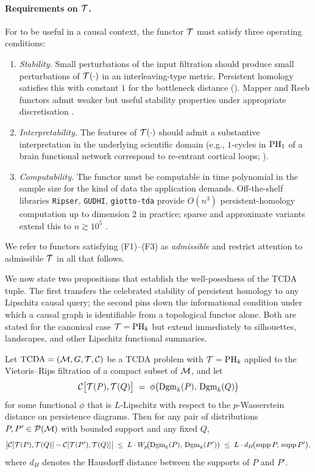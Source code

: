 \paragraph{Requirements on $\mathcal{T}$.}
For  to be useful in a causal context, the functor $\mathcal{T}$
must satisfy three operating conditions:
\begin{enumerate}[leftmargin=2em,label=(F\arabic*)]
\item \emph{Stability.} Small perturbations of the input filtration
should produce small perturbations of $\mathcal{T}(\cdot)$ in an interleaving-type
metric. Persistent homology satisfies this with constant $1$ for the
bottleneck distance (). Mapper and Reeb functors
admit weaker but useful stability properties under appropriate
discretisation \citep{munch2016convergence,carriere2018statistical}.
\item \emph{Interpretability.} The features of $\mathcal{T}(\cdot)$ should admit
a substantive interpretation in the underlying scientific domain (e.g.,
$1$-cycles in $\mathrm{PH}_{1}$ of a brain functional network correspond to
re-entrant cortical loops; \citealp{elyaagoubi2023statistical,
sizemore2018cliques}).
\item \emph{Computability.} The functor must be computable in time
polynomial in the sample size for the kind of data the application
demands. Off-the-shelf libraries \texttt{Ripser}, \texttt{GUDHI},
\texttt{giotto-tda} provide $O(n^3)$ persistent-homology computation up
to dimension $2$ in practice; sparse and approximate variants extend
this to $n \gtrsim 10^5$ \citep{bauer2021ripser,otter2017roadmap,
tauzin2021giotto}.
\end{enumerate}
We refer to functors satisfying (F1)--(F3) as \emph{admissible} and
restrict attention to admissible $\mathcal{T}$ in all that follows.

We now state two propositions that establish the well-posedness of the
TCDA tuple. The first transfers the celebrated stability of persistent
homology to any Lipschitz causal query; the second pins down the
informational condition under which a causal graph is identifiable from
a topological functor alone. Both are stated for the canonical case
$\mathcal{T} = \mathrm{PH}_{k}$ but extend immediately to silhouettes, landscapes, and
other Lipschitz functional summaries.

\begin{proposition}\label{prop:stability-transfer}
Let $\mathrm{TCDA} = (\mathcal{M}, G, \mathcal{T}, \mathcal{C})$ be a TCDA problem with $\mathcal{T} = \mathrm{PH}_{k}$
applied to the Vietoris--Rips filtration of a compact subset of $\mathcal{M}$,
and let
\[
  \mathcal{C}\bigl[\mathcal{T}(P), \mathcal{T}(Q)\bigr] \;=\; \phi\bigl(\mathrm{Dgm}_{k}(P),\,\mathrm{Dgm}_{k}(Q)\bigr)
\]
for some functional $\phi$ that is $L$-Lipschitz with respect to the
$p$-Wasserstein distance on persistence diagrams. Then for any pair of
distributions $P, P' \in \mathcal{P}(\mathcal{M})$ with bounded support and any
fixed $Q$,
\[
\bigl|\mathcal{C}[\mathcal{T}(P),\mathcal{T}(Q)] - \mathcal{C}[\mathcal{T}(P'),\mathcal{T}(Q)]\bigr|
\;\leq\; L \cdot W_p\!\bigl(\mathrm{Dgm}_{k}(P),\,\mathrm{Dgm}_{k}(P')\bigr)
\;\leq\; L \cdot d_H\!\bigl(\operatorname{supp} P,\, \operatorname{supp} P'\bigr),
\]
where $d_H$ denotes the Hausdorff distance between the supports of $P$
and $P'$.
\end{proposition}

